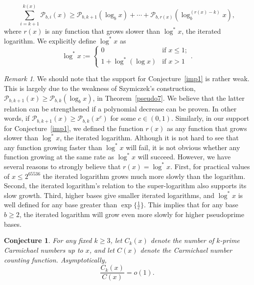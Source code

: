 \documentclass[11pt]{article}
\theoremstyle{plain}
\newtheorem{conj}[subsubsection]{Conjecture}
\theoremstyle{definition}
\theoremstyle{remark}
\newtheorem{remark}[subsubsection]{Remark}
\numberwithin{equation}{subsection}
\begin{document}
\begin{equation} \label{29}
\sum_{i={{k}+1}}^{k(x)}{\mathscr{P}_{b,i}(x)} \ge \mathscr{P}_{b,{k+1}}(\log_{b} x)+\cdots+\mathscr{P}_{b,{r(x)}}(\log^{({r(x)}-{k})}_{b} x),
\end{equation}
where $r(x)$ is any function that grows slower than $\log^* x$, the iterated logarithm. We explicitly define $\log^* x$ as
\begin{equation} \label{30}
\log^* x :=   \begin{cases}     0                  & \mbox{if } x \le 1; \\     1 + \log^*(\log x) & \mbox{if } x > 1    \end{cases} .
\end{equation}
\begin{remark}
We should note that the support for Conjecture~\ref{imp1} is rather weak. This is largely due to the weakness of Szymiczek's construction, $\mathscr{P}_{b,{{k}+1}}(x) \ge \mathscr{P}_{b,k}(\log_{b} x)$, in Theorem~\ref{pseudo7}. We believe that the latter relation can be strengthened if a polynomial decrease can be proven. In other words, if $\mathscr{P}_{b,{{k}+1}}(x) \ge \mathscr{P}_{b,k}(x^{c})$ for some $c \in (0,1)$. Similarly, in our support for Conjecture~\ref{imp1}, we defined the function $r(x)$ as any function that grows slower than $\log^* x$, the iterated logarithm. Although it is not hard to see that any function growing faster than $\log^* x$ will fail, it is not obvious whether any function growing at the same rate as $\log^* x$ will succeed. However, we have several reasons to strongly believe that $r(x) = \log^* x$. First, for practical values of $x \le 2^{65536}$ the iterated logarithm grows much more slowly than the logarithm.
Second, the iterated logarithm's relation to the super-logarithm also supports its slow growth. Third, higher bases give smaller iterated logarithms, and $\log^* x$ is well defined for any base greater than $\exp\Big\{\frac{1}{e}\Bigr\}$. This implies that for any base $b \ge 2$, the iterated logarithm will grow even more slowly for higher pseudoprime bases.
\end{remark}
\begin{conj} \label{imp2}
For any fixed $k \ge 3$, let $C_k(x)$ denote the number of $k$-prime Carmichael numbers up to $x$, and let $C(x)$ denote the Carmichael number counting function.
Asymptotically,
\begin{equation} \label{31}
{\frac{C_k(x)}{C(x)}} = o(1).
\end{equation}
\end{conj}
\end{document}
